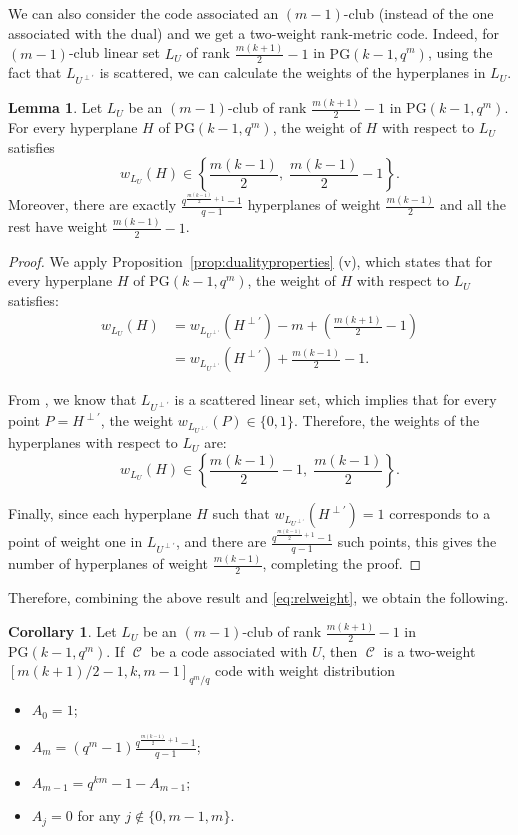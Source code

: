 \documentclass[11pt]{amsart}
\DeclareMathOperator{\C}{\mathcal{C}}
\theoremstyle{definition}
\newtheorem{lemma}[theorem]{Lemma}
\newtheorem{corollary}[theorem]{Corollary}
\begin{document}
We can also consider the code associated an $(m-1)$-club (instead of the one associated with the dual) and we get a two-weight rank-metric code. Indeed, for $(m-1)$-club linear set $L_U$ of rank $\frac{m(k+1)}{2} - 1$ in $\mathrm{PG}(k-1,q^m)$, using the fact that $L_{U^{\perp'}}$ is scattered, we can calculate the weights of the hyperplanes in $L_U$. 
\begin{lemma}\label{lem:weightslinesclass}
 Let $L_U$ be an $(m-1)$-club of rank $\frac{m(k+1)}{2} - 1$ in $\mathrm{PG}(k-1,q^m)$. For every hyperplane \(H\) of \(\mathrm{PG}(k-1, q^m)\), the weight of \(H\) with respect to \(L_U\) satisfies
\[
w_{L_U}(H) \in \left\{ \frac{m(k-1)}{2},\; \frac{m(k-1)}{2} - 1 \right\}.
\]
Moreover, there are exactly \(\frac{q^{\frac{m(k-1)}{2} + 1} - 1}{q - 1}\) hyperplanes of weight \(\frac{m(k-1)}{2}\) and all the rest have weight \(\frac{m(k-1)}{2}-1\).
\end{lemma}
\begin{proof}
We apply Proposition~\ref{prop:dualityproperties} (v), which states that for every hyperplane \(H\) of \(\mathrm{PG}(k-1, q^m)\), the weight of \(H\) with respect to \(L_U\) satisfies:
\[
\begin{split}
w_{L_U}(H) &= w_{L_{U^{\perp'}}}(H^{\perp'}) - m + \left( \frac{m(k+1)}{2} - 1 \right) \\
           &= w_{L_{U^{\perp'}}}(H^{\perp'}) + \frac{m(k - 1)}{2} - 1.
\end{split}
\]

From , we know that \(L_{U^{\perp'}}\) is a scattered linear set, which implies that for every point \(P=H^{\perp'}\), the weight \(w_{L_{U^{\perp'}}}(P) \in \{0, 1\}\). Therefore, the weights of the hyperplanes with respect to \(L_U\) are:
\[
w_{L_U}(H) \in \left\{ \frac{m(k - 1)}{2} - 1,\; \frac{m(k - 1)}{2} \right\}.
\]

Finally, since each hyperplane \(H\) such that \(w_{L_{U^{\perp'}}}(H^{\perp'}) = 1\) corresponds to a point of weight one in \(L_{U^{\perp'}}\), and there are \(\frac{q^{\frac{m(k-1)}{2} + 1} - 1}{q - 1}\) such points, this gives the number of hyperplanes of weight \(\frac{m(k - 1)}{2}\), completing the proof.
\end{proof}

Therefore, combining the above result and \eqref{eq:relweight}, we obtain the following.

\begin{corollary}
    Let $L_U$ be an $(m-1)$-club of rank $\frac{m(k+1)}{2} - 1$ in $\mathrm{PG}(k-1,q^m)$. If $\C$ be a code associated with $U$, then $\C$ is a two-weight $[m(k+1)/2-1,k,m-1]_{q^m/q}$ code with weight distribution
    \begin{itemize}
        \item $A_0=1$;
        \item $A_{m}=(q^m-1)\frac{q^{\frac{m(k-1)}{2} + 1} - 1}{q - 1}$;
         \item $A_{m-1}=q^{km}-1-A_{m-1}$;
        \item $A_j=0$ for any $j \notin\{0,m-1,m\}$.
    \end{itemize}
\end{corollary}
\end{document}

